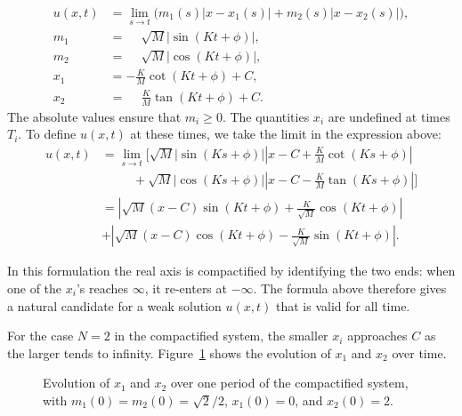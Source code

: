 \documentclass[english,master]{liumaiex}
\theoremstyle{thesisplain}
\theoremstyle{thesisdefinition}
\numberwithin{equation}{section}
\begin{document}
\begin{align}
	u(x, t) &= \lim_{s \to t} \big(m_1(s)|x - x_1(s)| + m_2(s)|x - x_2(s)|\big), \\
	m_1 &= \phantom{-}\sqrt{M} |\sin(Kt + \phi)|, \\
	m_2 &= \phantom{-}\sqrt{M} |\cos(Kt + \phi)|, \\
	x_1 &= -\frac{K}{M}\cot(Kt + \phi) + C, \\
	x_2 &= \phantom{-}\frac{K}{M}\tan(Kt + \phi) + C.
\end{align}
The absolute values ensure that $m_i \ge 0$. The quantities $x_i$ are undefined at times $T_i$. To define $u(x, t)$ at these times, we take the limit in the expression above:
\begin{equation}
\begin{aligned}
u(x,t)
&=
\lim_{s\to t} \Bigg[
\sqrt{M}|\sin(Ks+\phi)| \left| x-C+\frac{K}{M}\cot(Ks+\phi) \right|
\\
&\phantom{\lim_{s\to t} \Bigg[}
+
\sqrt{M}|\cos(Ks+\phi)| \left| x-C-\frac{K}{M}\tan(Ks+\phi) \right|
\Bigg]\\
&=
\left|
\sqrt{M}(x-C)\sin(Kt+\phi)
+
\frac{K}{\sqrt{M}}\cos(Kt+\phi)
\right|\\
&+
\left|
\sqrt{M}(x-C)\cos(Kt+\phi)
-
\frac{K}{\sqrt{M}}\sin(Kt+\phi)
\right|
.
\end{aligned}
\end{equation}

In this formulation the real axis is compactified by identifying the two ends: when one of the $x_i$'s reaches $\infty$, it re-enters at $-\infty$. The formula above therefore gives a natural candidate for a weak solution $u(x,t)$ that is valid for all time.

For the case $N=2$ in the compactified system, the smaller $x_i$ approaches $C$ as the larger tends to infinity. Figure~\ref{fig:N2X} shows the evolution of $x_1$ and $x_2$ over time.
\begin{figure}[H]
\centering
	\caption{Evolution of $x_1$ and $x_2$ over one period of the compactified system, with $m_1(0)=m_2(0)=\sqrt{2}/2$, $x_1(0)=0$, and $x_2(0)=2$.}
	\label{fig:N2X}
\end{figure}
\end{document}
